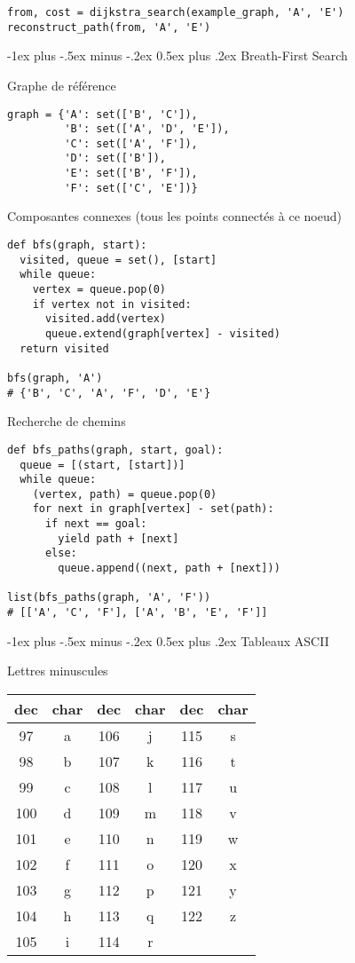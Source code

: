 \documentclass[10pt,landscape]{article}
\makeatletter
\renewcommand{\section}{\@startsection{section}{1}{0mm}%
                                {-1ex plus -.5ex minus -.2ex}%
                                {0.5ex plus .2ex}%
                                {\normalfont\large\bfseries}}
\makeatother
\begin{document}
\begin{multicols}{3}
\begin{verbatim}
from, cost = dijkstra_search(example_graph, 'A', 'E')
reconstruct_path(from, 'A', 'E')
\end{verbatim}

\section{Breath-First Search}


Graphe de référence

\begin{verbatim}
graph = {'A': set(['B', 'C']),
         'B': set(['A', 'D', 'E']),
         'C': set(['A', 'F']),
         'D': set(['B']),
         'E': set(['B', 'F']),
         'F': set(['C', 'E'])}
\end{verbatim}

Composantes connexes (tous les points connectés à ce noeud)

\begin{verbatim}
def bfs(graph, start):
  visited, queue = set(), [start]
  while queue:
    vertex = queue.pop(0)
    if vertex not in visited:
      visited.add(vertex)
      queue.extend(graph[vertex] - visited)
  return visited

bfs(graph, 'A')
# {'B', 'C', 'A', 'F', 'D', 'E'}
\end{verbatim}

Recherche de chemins

\begin{verbatim}
def bfs_paths(graph, start, goal):
  queue = [(start, [start])]
  while queue:
    (vertex, path) = queue.pop(0)
    for next in graph[vertex] - set(path):
      if next == goal:
        yield path + [next]
      else:
        queue.append((next, path + [next]))

list(bfs_paths(graph, 'A', 'F')) 
# [['A', 'C', 'F'], ['A', 'B', 'E', 'F']]
\end{verbatim}

\section{Tableaux ASCII}

Lettres minuscules

\begin{tabular}{c|c||c|c||c|c}
\hline
dec & char & dec & char & dec & char\\
\hline
97  & a & 106 & j & 115 & s \\
98  & b & 107 & k & 116 & t \\
99  & c & 108 & l & 117 & u \\
100 & d & 109 & m & 118 & v \\
101 & e & 110 & n & 119 & w \\
102 & f & 111 & o & 120 & x \\
103 & g & 112 & p & 121 & y \\
104 & h & 113 & q & 122 & z \\
105 & i & 114 & r &     &   \\
\hline
\end{tabular}


\end{multicols}
\end{document}
